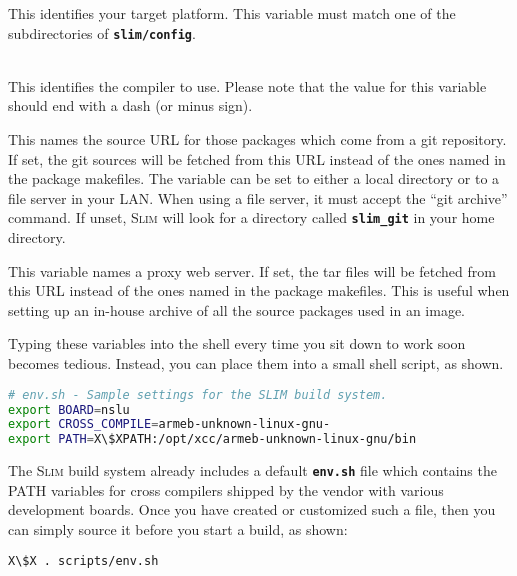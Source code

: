 \documentclass[a4paper,10pt]{article}
\newenvironment{Description}[1][\quad]{%
  \begin{list}{}{%
      \renewcommand{\makelabel}[1]{\textbf{##1}\hfill}%
      \settowidth{\labelwidth}{\textbf{#1}}%
      \setlength{\leftmargin}{\labelwidth+\labelsep}%
  }%
}{%
  \end{list}%
}
\newcommand{\slim}{\textsc{Slim}\xspace}
\newcommand{\fw}{\tt\bf}
\begin{document}
    \begin{Description}[SLIM\_WGETX]

    \item[BOARD]
      This identifies your target platform. This variable must match
      one of the subdirectories of {\fw slim/config}.

    \item[CROSS\_COMPILE]\mbox{}\\
      This identifies the compiler to use. Please note that the value
      for this variable should end with a dash (or minus sign).

    \item[SLIM\_GIT]
      This names the source URL for those packages which come from a
      git repository. If set, the git sources will be fetched from
      this URL instead of the ones named in the package makefiles.
      The variable can be set to either a local directory or to a file
      server in your LAN. When using a file server, it must accept the
      ``git archive'' command.  If unset, \slim will look for a
      directory called {\fw slim\_git} in your home directory.

    \item[SLIM\_WGET]
      This variable names a proxy web server. If set, the tar files
      will be fetched from this URL instead of the ones named in the
      package makefiles. This is useful when setting up an in-house
      archive of all the source packages used in an image.

    \end{Description}

    Typing these variables into the shell every time you sit down to
    work soon becomes tedious. Instead, you can place them into a
    small shell script, as shown.

\begin{lstlisting}[language=bash,escapechar=X]
# env.sh - Sample settings for the SLIM build system.
export BOARD=nslu
export CROSS_COMPILE=armeb-unknown-linux-gnu-
export PATH=X\$XPATH:/opt/xcc/armeb-unknown-linux-gnu/bin
\end{lstlisting}

    The \slim build system already includes a default {\fw env.sh}
    file which contains the PATH variables for cross compilers shipped
    by the vendor with various development boards. Once you have
    created or customized such a file, then you can simply source it
    before you start a build, as shown:

\begin{lstlisting}[language=bash,escapechar=X]
X\$X . scripts/env.sh
\end{lstlisting}
\end{document}
